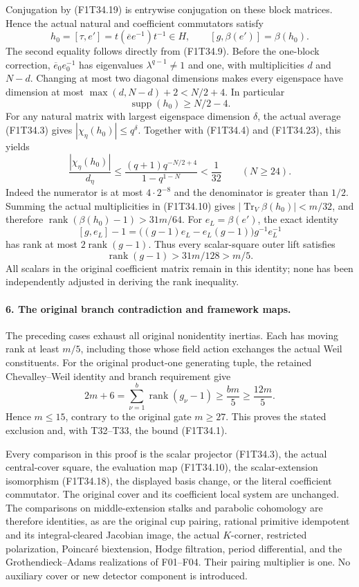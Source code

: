 Conjugation by (F1T34.19) is entrywise conjugation
on these block matrices. Hence the actual natural
and coefficient commutators satisfy
\[
 h_0=[\tau,e']=t(\overline e e^{-1})t^{-1}\in H,
 \qquad
 [g,\beta(e')]=\beta(h_0).
 \tag{F1T34.22}
\]
The second equality follows directly from
(F1T34.9). Before the one-block correction,
\(\overline e_0 e_0^{-1}\) has eigenvalues
\(\lambda^{q-1}\ne1\) and one, with multiplicities
\(d\) and \(N-d\). Changing at most two diagonal
dimensions makes every eigenspace have dimension
at most \(\max(d,N-d)+2<N/2+4\). In particular
\[
                       \operatorname{supp}(h_0)\ge N/2-4.
 \tag{F1T34.23}
\]
For any natural matrix with largest eigenspace
dimension \(\delta\), the actual average (F1T34.3)
gives \(|\chi_\eta(h_0)|\le q^\delta\).
Together with (F1T34.4) and (F1T34.23), this yields
\[
 \frac{|\chi_\eta(h_0)|}{d_\eta}
 \le\frac{(q+1)q^{-N/2+4}}{1-q^{1-N}}
 <\frac1{32}\qquad(N\ge24).
 \tag{F1T34.24}
\]
Indeed the numerator is at most \(4\cdot2^{-8}\)
and the denominator is greater than \(1/2\).
Summing the actual multiplicities in (F1T34.10)
gives \(|\operatorname{Tr}_V\beta(h_0)|<m/32\),
and therefore
\(\operatorname{rank}(\beta(h_0)-1)>31m/64\).
For \(e_L=\beta(e')\), the exact identity
\[
 [g,e_L]-1
  =\bigl((g-1)e_L-e_L(g-1)\bigr)g^{-1}e_L^{-1}
 \tag{F1T34.25}
\]
has rank at most \(2\operatorname{rank}(g-1)\).
Thus every scalar-square outer lift satisfies
\[
             \operatorname{rank}(g-1)>31m/128>m/5.
 \tag{F1T34.26}
\]
All scalars in the original coefficient matrix
remain in this identity; none has been independently
adjusted in deriving the rank inequality.

\paragraph{6. The original branch contradiction and framework maps.}
The preceding cases exhaust all original nonidentity
inertias. Each has moving rank at least \(m/5\),
including those whose field action exchanges the
actual Weil constituents. For the original
product-one generating tuple, the retained
Chevalley--Weil identity and branch requirement give
\[
      2m+6=\sum_{\nu=1}^{b}\operatorname{rank}(g_\nu-1)
                  \ge\frac{bm}{5}\ge\frac{12m}{5}.
 \tag{F1T34.27}
\]
Hence \(m\le15\), contrary to the original gate
\(m\ge27\). This proves the stated exclusion and,
with T32--T33, the bound (F1T34.1).

Every comparison in this proof is the scalar
projector (F1T34.3), the actual central-cover square,
the evaluation map (F1T34.10), the scalar-extension
isomorphism (F1T34.18), the displayed basis change,
or the literal coefficient commutator. The original
cover and its coefficient local system are unchanged.
The comparisons on middle-extension stalks and
parabolic cohomology are therefore identities, as
are the original cup pairing, rational primitive
idempotent and its integral-cleared Jacobian image,
the actual \(K\)-corner, restricted polarization,
Poincar\'e biextension, Hodge filtration, period
differential, and the Grothendieck--Adams
realizations of F01--F04. Their pairing multiplier
is one. No auxiliary cover or new detector
component is introduced.
